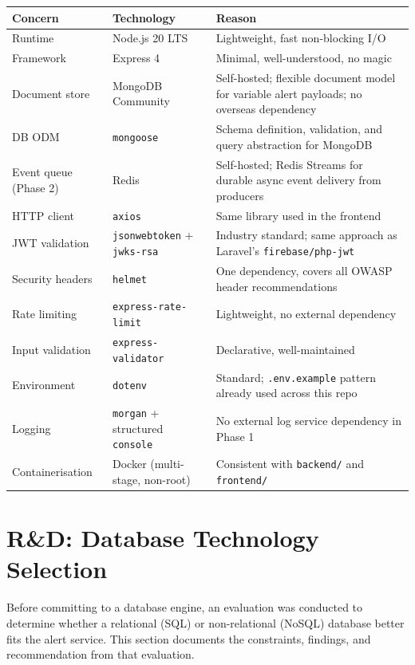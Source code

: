 \documentclass[11pt]{article}
\begin{document}
\begin{table}[h]
\small
\begin{tabularx}{\textwidth}{l l X}
\toprule
\textbf{Concern} & \textbf{Technology} & \textbf{Reason} \\
\midrule
Runtime & Node.js 20 LTS & Lightweight, fast non-blocking I/O \\
Framework & Express 4 & Minimal, well-understood, no magic \\
Document store & MongoDB Community & Self-hosted; flexible document model for variable alert payloads; no overseas dependency \\
DB ODM & \texttt{mongoose} & Schema definition, validation, and query abstraction for MongoDB \\
Event queue (Phase 2) & Redis & Self-hosted; Redis Streams for durable async event delivery from producers \\
HTTP client & \texttt{axios} & Same library used in the frontend \\
JWT validation & \texttt{jsonwebtoken} + \texttt{jwks-rsa} & Industry standard; same approach as Laravel's \texttt{firebase/php-jwt} \\
Security headers & \texttt{helmet} & One dependency, covers all OWASP header recommendations \\
Rate limiting & \texttt{express-rate-limit} & Lightweight, no external dependency \\
Input validation & \texttt{express-validator} & Declarative, well-maintained \\
Environment & \texttt{dotenv} & Standard; \texttt{.env.example} pattern already used across this repo \\
Logging & \texttt{morgan} + structured \texttt{console} & No external log service dependency in Phase 1 \\
Containerisation & Docker (multi-stage, non-root) & Consistent with \texttt{backend/} and \texttt{frontend/} \\
\bottomrule
\end{tabularx}
\end{table}

\section{R\&D: Database Technology Selection}

Before committing to a database engine, an evaluation was conducted to determine whether
a relational (SQL) or non-relational (NoSQL) database better fits the alert service.
This section documents the constraints, findings, and recommendation from that evaluation.
\end{document}
